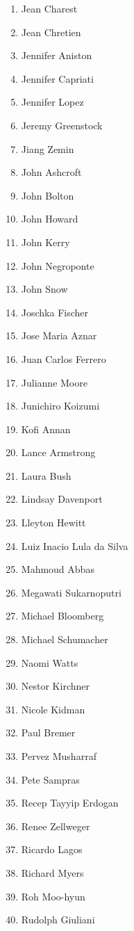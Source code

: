 \documentclass[12pt]{article}
\begin{document}
\begin{multicols}{3}
\begin{enumerate}[itemsep=0pt]
    \item Jean Charest
    \item Jean Chretien
    \item Jennifer Aniston
    \item Jennifer Capriati
    \item Jennifer Lopez
    \item Jeremy Greenstock
    \item Jiang Zemin
    \item John Ashcroft
    \item John Bolton
    \item John Howard
    \item John Kerry
    \item John Negroponte
    \item John Snow
    \item Joschka Fischer
    \item Jose Maria Aznar
    \item Juan Carlos Ferrero
    \item Julianne Moore
    \item Junichiro Koizumi
    \item Kofi Annan
    \item Lance Armstrong
    \item Laura Bush
    \item Lindsay Davenport
    \item Lleyton Hewitt
    \item Luiz Inacio Lula da Silva
    \item Mahmoud Abbas
    \item Megawati Sukarnoputri
    \item Michael Bloomberg
    \item Michael Schumacher
    \item Naomi Watts
    \item Nestor Kirchner
    \item Nicole Kidman
    \item Paul Bremer
    \item Pervez Musharraf
    \item Pete Sampras
    \item Recep Tayyip Erdogan
    \item Renee Zellweger
    \item Ricardo Lagos
    \item Richard Myers
    \item Roh Moo-hyun
    \item Rudolph Giuliani

\end{enumerate}
\end{multicols}
\end{document}
